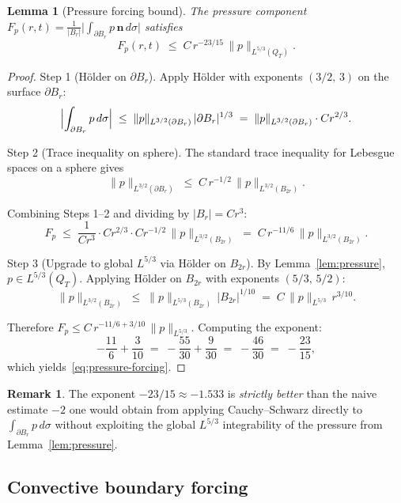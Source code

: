 \documentclass[11pt]{article}
\newtheorem{lemma}[theorem]{Lemma}
\theoremstyle{definition}
\newtheorem{remark}[theorem]{Remark}
\theoremstyle{remark}
\begin{document}
\begin{lemma}[Pressure forcing bound]\label{lem:pressure-forcing}
  The pressure component
  $F_p(r,t) = \tfrac{1}{|B_r|}\bigl|\int_{\partial B_r} p\,\mathbf{n}\,d\sigma\bigr|$
  satisfies
  \begin{equation}\label{eq:pressure-forcing}
    F_p(r,t) \;\leq\; C\,r^{-23/15}\,\|p\|_{L^{5/3}(Q_T)}.
  \end{equation}
\end{lemma}
\begin{proof}
Step 1 (H\"{o}lder on $\partial B_r$).
Apply H\"{o}lder with exponents $(3/2,\,3)$ on the surface $\partial B_r$:
\[
  \Bigl|\int_{\partial B_r} p\,d\sigma\Bigr|
  \;\leq\; \|p\|_{L^{3/2}(\partial B_r)}\,|\partial B_r|^{1/3}
  \;=\; \|p\|_{L^{3/2}(\partial B_r)}\cdot C r^{2/3}.
\]

Step 2 (Trace inequality on sphere).
The standard trace inequality for Lebesgue spaces on a sphere gives
\[
  \|p\|_{L^{3/2}(\partial B_r)} \;\leq\; C\,r^{-1/2}\,\|p\|_{L^{3/2}(B_{2r})}.
\]

Combining Steps 1--2 and dividing by $|B_r| = Cr^3$:
\[
  F_p \;\leq\; \frac{1}{Cr^3}\cdot C r^{2/3}\cdot C r^{-1/2}\,\|p\|_{L^{3/2}(B_{2r})}
  \;=\; C\,r^{-11/6}\,\|p\|_{L^{3/2}(B_{2r})}.
\]

Step 3 (Upgrade to global $L^{5/3}$ via H\"{o}lder on $B_{2r}$).
By Lemma~\ref{lem:pressure}, $p\in L^{5/3}(Q_T)$.  Applying H\"{o}lder on $B_{2r}$
with exponents $(5/3,\,5/2)$:
\[
  \|p\|_{L^{3/2}(B_{2r})}
  \;\leq\; \|p\|_{L^{5/3}(B_{2r})}\,|B_{2r}|^{1/10}
  \;=\; C\,\|p\|_{L^{5/3}}\,r^{3/10}.
\]

Therefore $F_p \leq C\,r^{-11/6 + 3/10}\,\|p\|_{L^{5/3}}$.  Computing the exponent:
\[
  -\frac{11}{6} + \frac{3}{10} \;=\; -\frac{55}{30} + \frac{9}{30} \;=\; -\frac{46}{30}
  \;=\; -\frac{23}{15},
\]
which yields~\eqref{eq:pressure-forcing}.
\end{proof}

\begin{remark}
  The exponent $-23/15 \approx -1.533$ is \emph{strictly better} than the naive
  estimate $-2$ one would obtain from applying Cauchy--Schwarz directly to
  $\int_{\partial B_r} p\,d\sigma$ without exploiting the global $L^{5/3}$
  integrability of the pressure from Lemma~\ref{lem:pressure}.
\end{remark}

\subsection{Convective boundary forcing}
\end{document}
